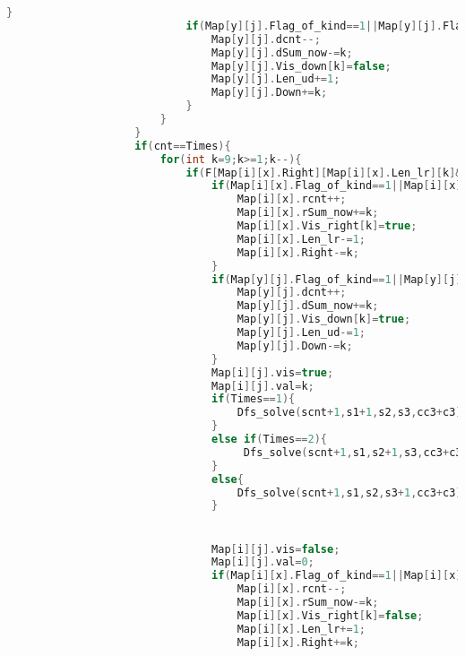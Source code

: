 \begin{lstlisting}[language=C++, firstnumber=1, basicstyle=\tiny]
                            }
                            if(Map[y][j].Flag_of_kind==1||Map[y][j].Flag_of_kind==4){//4表示只有下
                                Map[y][j].dcnt--;
                                Map[y][j].dSum_now-=k;
                                Map[y][j].Vis_down[k]=false;
                                Map[y][j].Len_ud+=1;
                                Map[y][j].Down+=k;
                            }
                        }
                    }
                    if(cnt==Times){
                        for(int k=9;k>=1;k--){
                            if(F[Map[i][x].Right][Map[i][x].Len_lr][k]&&F[Map[y][j].Down][Map[y][j].Len_ud][k]&&!Map[i][x].Vis_right[k]&&!Map[y][j].Vis_down[k]){
                                if(Map[i][x].Flag_of_kind==1||Map[i][x].Flag_of_kind==3){
                                    Map[i][x].rcnt++;
                                    Map[i][x].rSum_now+=k;
                                    Map[i][x].Vis_right[k]=true;
                                    Map[i][x].Len_lr-=1;
                                    Map[i][x].Right-=k;
                                }
                                if(Map[y][j].Flag_of_kind==1||Map[y][j].Flag_of_kind==4){
                                    Map[y][j].dcnt++;
                                    Map[y][j].dSum_now+=k;
                                    Map[y][j].Vis_down[k]=true;
                                    Map[y][j].Len_ud-=1;
                                    Map[y][j].Down-=k;
                                }
                                Map[i][j].vis=true;
                                Map[i][j].val=k;
                                if(Times==1){
                                	Dfs_solve(scnt+1,s1+1,s2,s3,cc3+c3);
								}
								else if(Times==2){
									 Dfs_solve(scnt+1,s1,s2+1,s3,cc3+c3);
								}
								else{
									Dfs_solve(scnt+1,s1,s2,s3+1,cc3+c3);
								}


                                Map[i][j].vis=false;
                                Map[i][j].val=0;
                                if(Map[i][x].Flag_of_kind==1||Map[i][x].Flag_of_kind==3){//3表示只有右
                                    Map[i][x].rcnt--;
                                    Map[i][x].rSum_now-=k;
                                    Map[i][x].Vis_right[k]=false;
                                    Map[i][x].Len_lr+=1;
                                    Map[i][x].Right+=k;


\end{lstlisting}
